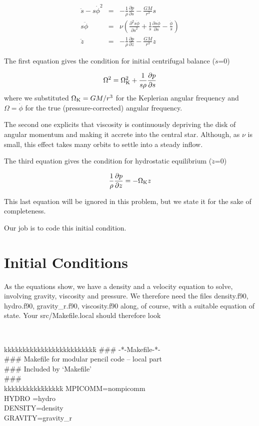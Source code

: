 \documentclass[a4paper,10pt]{article}
\newcommand{\pderiv}[2]{\frac{\partial #1}{\partial #2}}
\newcommand{\pderivn}[3]{\frac{{\partial{}}^{#3} #1}{{\partial #2}^{#3}}}
\begin{document}
\begin{eqnarray}
\ddot{s} - s{\dot{\phi}}^2 &=&  -\frac{1}{\rho}\pderiv{p}{s} - \frac{GM}{r^3}s\\ 
s\ddot{\phi}  &=&  \nu \left(\pderivn{s\dot\phi}{s}{2} + \frac{1}{s}\pderiv{s\dot{\phi}}{s} - \frac{\dot\phi}{s} \right)\\
\ddot{z}  &=& -\frac{1}{\rho}\pderiv{p}{z} - \frac{GM}{r^3}z 
\end{eqnarray}

The first equation gives the condition for initial centrifugal balance ($\ddot{s}$=0)

\begin{equation}
  \label{centrifugal}
  \Omega^2 = \Omega_{\rm K}^2 + \frac{1}{s\rho}\pderiv{p}{s} 
\end{equation}where we substituted $\Omega_{\rm K}=GM/r^3$ for the Keplerian angular frequency and $\Omega=\dot\phi$ for the true (pressure-corrected) angular frequency.

The second one explicits that viscosity is continuously depriving the disk
of angular momentum and making it accrete into the central star.
Although, as $\nu$ is small, this effect takes many orbits to settle into a steady inflow. 

The third equation gives the condition for hydrostatic equilibrium ($\ddot{z}$=0)

\begin{equation}
  \frac{1}{\rho}\pderiv{p}{z} = -\Omega_{\rm K} z 
\end{equation}

This last equation will be ignored in this problem, but we state it for the sake of completeness. 

Our job is to code this initial condition.

\section{Initial Conditions}

As the equations show, we have a density and a velocity equation to solve, involving gravity, viscosity and pressure. We therefore need the files density.f90, hydro.f90, gravity\_r.f90, viscosity.f90 along, of course, with a suitable equation of state. Your src/Makefile.local should therefore look


{\tt 
\begin{tabbing}
kkkkkkkkkkkkkkkkkkkkkkkkk\=\kill
\#\#\#  \>  -*-Makefile-*-\\
\#\#\# Makefile for modular pencil code -- local part\\
\#\#\# Included by `Makefile'\\
\#\#\#\\

kkkkkkkkkk\=kkkkkk\=\kill
MPICOMM\>=\>nompicomm\\
HYDRO  \>=\>hydro\\
DENSITY\>=\>density\\
GRAVITY\>=\>gravity\_r
\end{tabbing}
}
\end{document}
